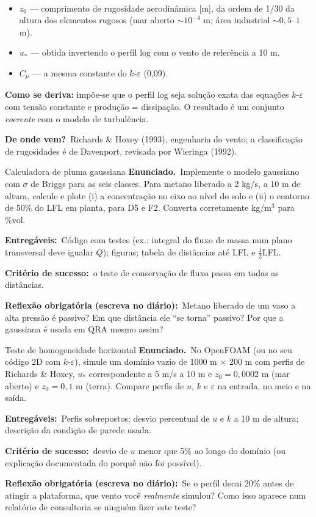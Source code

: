 \documentclass[10pt,a4paper,twocolumn,openany]{report}
\newcommand{\lead}[2]{\par\medskip\noindent{\color{#1}\bfseries #2}\ }
\newenvironment{dicionario}[1][Dicionário da equação]{\lead{azul}{#1.}\small}{\par\medskip}
\newcommand{\origem}{\par\smallskip\noindent\textcolor{azul}{\textbf{De onde vem?}}\ }
\newcommand{\enunciado}{\noindent\textbf{Enunciado.}\ }
\newcommand{\entregaveis}{\par\medskip\noindent\textbf{Entregáveis:}}
\newcommand{\criterio}{\par\medskip\noindent\textbf{Critério de sucesso:}\ }
\newcommand{\reflexao}{\par\medskip\noindent\textbf{Reflexão obrigatória (escreva no diário):}}
\begin{document}
\begin{dicionario}[Dicionário da equação: perfis de entrada]
\begin{itemize}[leftmargin=*,nosep]
  \item $z_0$ --- comprimento de rugosidade aerodinâmica [m], da ordem de
        1/30 da altura dos elementos rugosos (mar aberto $\sim10^{-4}$ m;
        área industrial $\sim0{,}5$--$1$ m).
  \item $u_*$ --- obtida invertendo o perfil log com o vento de referência a 10 m.
  \item $C_\mu$ --- a mesma constante do $k$-$\varepsilon$ (0,09).
\end{itemize}
\textbf{Como se deriva:} impõe-se que o perfil log seja solução exata das
equações $k$-$\varepsilon$ com tensão constante e produção = dissipação. O
resultado é um conjunto \emph{coerente} com o modelo de turbulência.
\origem Richards \& Hoxey (1993), engenharia do vento; a classificação de
rugosidades é de Davenport, revisada por Wieringa (1992).
\end{dicionario}


\begin{tarefa}{Calculadora de pluma gaussiana}
\enunciado Implemente o modelo gaussiano com $\sigma$ de Briggs para as seis
classes. Para metano liberado a 2 kg/s, a 10 m de altura, calcule e plote
(i) a concentração no eixo ao nível do solo e (ii) o contorno de 50\% do LFL
em planta, para D5 e F2. Converta corretamente kg/m$^3$ para \%vol.
\entregaveis\ Código com testes (ex.: integral do fluxo de massa num plano
transversal deve igualar $Q$); figuras; tabela de distâncias até LFL e $\frac12$LFL.
\criterio o teste de conservação de fluxo passa em todas as distâncias.
\reflexao\ Metano liberado de um vaso a alta pressão é passivo? Em que
distância ele ``se torna'' passivo? Por que a gaussiana é usada em QRA mesmo
assim?
\end{tarefa}

\begin{tarefa}{Teste de homogeneidade horizontal}
\enunciado No OpenFOAM (ou no seu código 2D com $k$-$\varepsilon$), simule
um domínio vazio de 1000 m $\times$ 200 m com perfis de Richards \& Hoxey,
$u_*$ correspondente a 5 m/s a 10 m e $z_0=0{,}0002$ m (mar aberto) e
$z_0=0{,}1$ m (terra). Compare perfis de $u$, $k$ e $\varepsilon$ na entrada,
no meio e na saída.
\entregaveis\ Perfis sobrepostos; desvio percentual de $u$ e $k$ a 10 m de
altura; descrição da condição de parede usada.
\criterio desvio de $u$ menor que 5\% ao longo do domínio (ou explicação
documentada do porquê não foi possível).
\reflexao\ Se o perfil decai 20\% antes de atingir a plataforma, que vento
você \emph{realmente} simulou? Como isso aparece num relatório de
consultoria se ninguém fizer este teste?
\end{tarefa}
\end{document}
